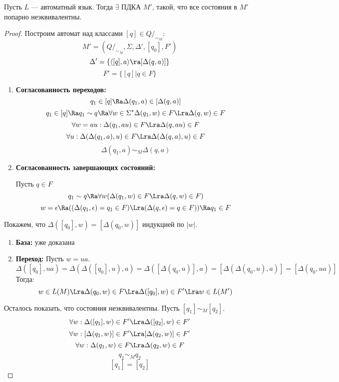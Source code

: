 \begin{lemma}
    Пусть \(L\) --- автоматный язык. Тогда \(\exists\) ПДКА \(M'\), такой, что все состояния в \(M'\) попарно неэквивалентны.
\end{lemma}
\begin{proof}
    Построим автомат над классами \([q] \in Q/_{\sim_M}\):
    \[M' = (Q/_{\sim_M}, \Sigma, \Delta', [q_0], F')\]
    \[\Delta' = \{\langle [q], a \rangle \ra [\Delta(q, a)]\}\]
    \[F' = \{[q] | q \in F\}\]
    \begin{enumerate}
        \item \textbf{Согласованность переходов:}
        \[q_1 \in [q] \Ra \Delta(q_1, a) \in [\Delta(q, a)]\]
        \[q_1 \in [q] \Ra q_1 \sim q \Ra \forall w \in \Sigma^* \Delta(q_1, w) \in F \Lra \Delta(q, w) \in F\]
        \[\forall w = au: \Delta(q_1, au) \in F \Lra \Delta(q, au) \in F\]
        \[\forall u: \Delta(\Delta(q_1, a), u) \in F \Lra \Delta(\Delta(q, a), u) \in F\]
        \[\Delta(q_1, a) \sim_M \Delta(q, a)\]

        \item \textbf{Согласованность завершающих состояний:}
        
        Пусть \(q \in F\)
        \[q_1 \sim q \Ra \forall w (\Delta(q_1, w) \in F \Lra \Delta(q, w) \in F)\]
        \[w = \epsilon \Ra ((\Delta(q_1, \epsilon) = q_1 \in F) \Lra (\Delta(q, \epsilon) = q \in F)) \Ra q_1 \in F\]
    \end{enumerate}

    Покажем, что \(\Delta([q_0], w) = [\Delta(q_0, w)]\) индукцией по \(|w|\).
    \begin{enumerate}
        \item[] \textbf{База:} уже доказана
        \item[] \textbf{Переход:} Пусть \(w = ua\).
        \[\Delta([q_0], ua) = \Delta(\Delta([q_0], u), a) = \Delta([\Delta(q_0, u)], a) = [\Delta(\Delta(q_0, u), a)] = [\Delta(q_0, ua)]\]
        Тогда:
        \[w \in L(M) \Lra \Delta(q_0, w) \in F \Lra \Delta([q_0], w) \in F' \Lra w \in L(M')\]
    \end{enumerate}

    Осталось показать, что состояния неэквивалентны.
    Пусть \([q_1] \sim_M [q_2]\).
    \[\forall w: \Delta([q_1], w) \in F' \Lra \Delta([q_2], w) \in F'\]
    \[\forall w: [\Delta(q_1, w)] \in F' \Lra [\Delta(q_2, w)] \in F'\]
    \[\forall w: \Delta(q_1, w) \in F \Lra \Delta(q_2, w) \in F\]
    \[q_1 \sim_M q_2\]
    \[[q_1] = [q_2]\]
\end{proof}

